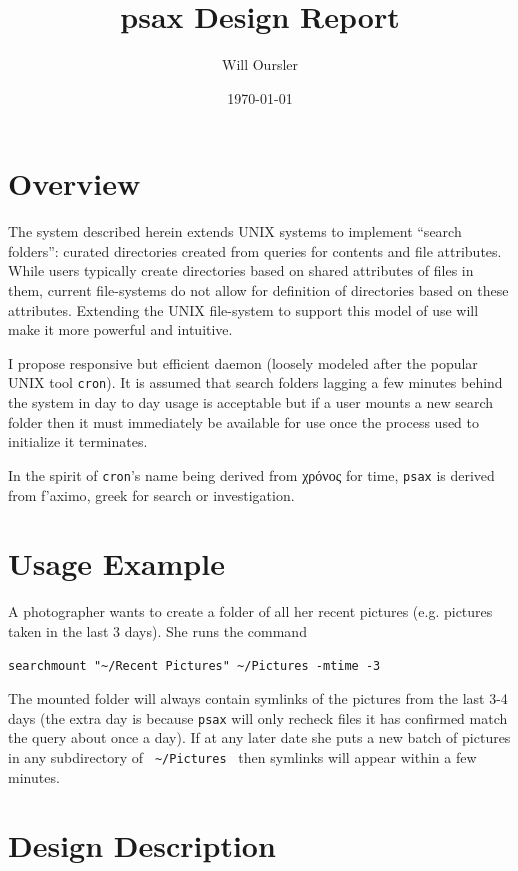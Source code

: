 \documentclass[a4paper]{report}
\title{psax Design Report}
\author{Will Oursler}
\date{\today}
\newcommand{\inlinecode}{\texttt}
\begin{document}
\maketitle

\section{Overview}

The system described herein extends UNIX systems to implement ``search folders'': curated directories created from queries for contents and file attributes. While users typically create directories based on shared attributes of files in them, current file-systems do not allow for definition of directories based on these attributes. Extending the UNIX file-system to support this model of use will make it more powerful and intuitive.

I propose responsive but efficient daemon (loosely modeled after the popular UNIX tool \inlinecode{cron}). It is assumed that search folders lagging a few minutes behind the system in day to day usage is acceptable but if a user mounts a new search folder then it must immediately be available for use once the process used to initialize it terminates.

In the spirit of \inlinecode{cron}'s name being derived from \textgreek{χρόνος} for time, \inlinecode{psax} is derived from \textgreek{f'aximo}, greek for search or investigation.

\section{Usage Example}

A photographer wants to create a folder of all her recent pictures (e.g. pictures taken in the last 3 days). She runs the command

\begin{center}
\inlinecode{searchmount "\textasciitilde/Recent Pictures" \textasciitilde/Pictures -mtime -3}
\end{center}

The mounted folder will always contain symlinks of the pictures from the last 3-4 days (the extra day is because \inlinecode{psax} will only recheck files it has confirmed match the query about once a day). If at any later date she puts a new batch of pictures in any subdirectory of \inlinecode{ \textasciitilde/Pictures } then symlinks will appear within a few minutes.

\section{Design Description}
\end{document}
